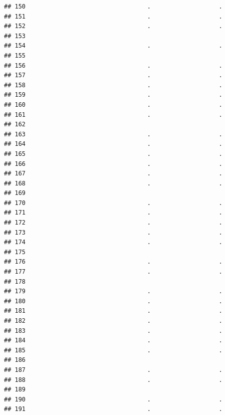 \documentclass[
]{article}
\begin{document}
\begin{verbatim}
## 150                                  .                   .
## 151                                  .                   .
## 152                                  .                   .
## 153                                                       
## 154                                  .                   .
## 155                                                       
## 156                                  .                   .
## 157                                  .                   .
## 158                                  .                   .
## 159                                  .                   .
## 160                                  .                   .
## 161                                  .                   .
## 162                                                       
## 163                                  .                   .
## 164                                  .                   .
## 165                                  .                   .
## 166                                  .                   .
## 167                                  .                   .
## 168                                  .                   .
## 169                                                       
## 170                                  .                   .
## 171                                  .                   .
## 172                                  .                   .
## 173                                  .                   .
## 174                                  .                   .
## 175                                                       
## 176                                  .                   .
## 177                                  .                   .
## 178                                                       
## 179                                  .                   .
## 180                                  .                   .
## 181                                  .                   .
## 182                                  .                   .
## 183                                  .                   .
## 184                                  .                   .
## 185                                  .                   .
## 186                                                       
## 187                                  .                   .
## 188                                  .                   .
## 189                                                       
## 190                                  .                   .
## 191                                  .                   .

\end{verbatim}
\end{document}
